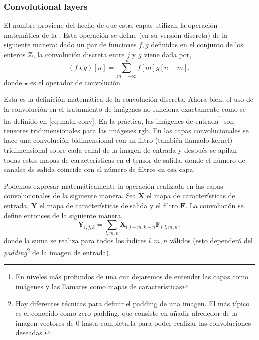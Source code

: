 \subsubsection{Convolutional layers}
El nombre proviene del hecho de que estas capas utilizan la operación
matemática de la
. Esta operación
se define (en su versión discreta) de la siguiente manera: dado un par de
funciones \(f, g\) definidas en el conjunto de los enteros \(\mathbb{Z}\), la
convolución discreta entre \(f\) y \(g\) viene dada por,
\begin{equation} \label{eq:math-conv}
  (f \star g)[n] = \sum_{m=-\infty}^{\infty} f[m]g[n - m],
\end{equation}
donde \(\star\) es el operador de convolución.

Esta es la definición matemática de la convolución discreta. Ahora bien, el uso
de la convolución en el tratamiento de imágenes no funciona exactamente como se
ha definido en \vref{eq:math-conv}. En la práctica, las imágenes de
entrada\footnote{En niveles más profundos de una \gls{cnn} dejaremos de
  entender las capas como imágenes y las llamares como mapas de
  características} son tensores tridimensionales para las imágenes
\acs{rgb}. En las capas convolucionales se hace una convolución
bidimensional con un filtro (también llamado kernel) tridimensional sobre cada
canal de la imagen de entrada y después se apilan todas estos mapas de
características en el tensor de salida, donde el número de canales de salida
coincide con el número de filtros en esa capa.

Podemos expresar matemáticamente la operación realizada en las capas
convolucionales de la siguiente manera. Sea \(\mathbf{X}\) el
mapa de características de entrada, \(\mathbf{Y}\) el mapa de características
de salida y el filtro \(\mathbf{F}\). La convolución se define entonces de la
siguiente manera,
\begin{equation} \label{eq:convolution}
  \mathbf{Y}_{i, j, k} =
  \sum_{l, m, n} \mathbf{X}_{l, j + m, k + n}\mathbf{F}_{i, l, m, n},
\end{equation}
donde la suma se realiza para todos los índices \(l, m, n\) válidos (esto
dependerá del \emph{padding}\footnote{Hay diferentes técnicas para definir el
  padding de una imagen. El más típico es el conocido como zero-padding, que
  consiste en añadir alrededor de la imagen vectores de 0 hasta completarla
  para poder realizar las convoluciones deseadas.} de la imagen de entrada).

